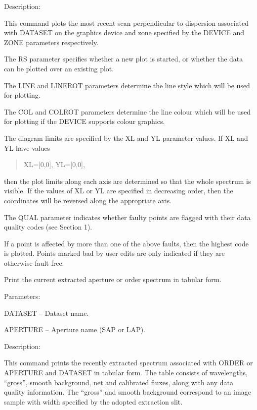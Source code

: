 \begin {description}
\begin {description}
\item Description:

This command plots the most recent scan perpendicular to dispersion 
associated with DATASET on the graphics device and zone specified by
the DEVICE and ZONE parameters respectively.

The RS parameter specifies whether a new plot is started, or whether
the data can be plotted over an existing plot.

The LINE and LINEROT parameters determine the line style which will be
used for plotting.

The COL and COLROT parameters determine the line colour which will be used
for plotting if the DEVICE supports colour graphics.

The diagram limits are specified by the XL and YL parameter values.
If XL and YL have values

\begin {quote}
XL=[0,0], YL=[0,0],
\end {quote}
then the plot limits along each axis are determined so that the whole
spectrum is visible.
If the values of XL or YL are specified in decreasing order, then
the coordinates will be reversed along the appropriate axis.

The QUAL parameter indicates whether faulty points are flagged with
their data quality codes (see Section 1).

If a point is affected by more than one of the above faults, then
the highest code is plotted.
Points marked bad by user edits are only indicated if they are otherwise
fault-free.
\end {description}

\item [PRGRS]
Print the current extracted aperture or order spectrum in tabular 
form.

\begin {description}
\item Parameters:

\begin {description}
\item DATASET -- Dataset name.
\item APERTURE -- Aperture name (SAP or LAP).
\end {description}

\item Description:

This command prints the recently extracted spectrum associated
with ORDER or APERTURE
and DATASET in tabular form.
The table consists of wavelengths, ``gross'', smooth background, net
and calibrated fluxes, along
with any data quality information.
The ``gross'' and smooth background correspond to an image sample
with width specified by the adopted extraction slit.


\end{description}
\end{description}
